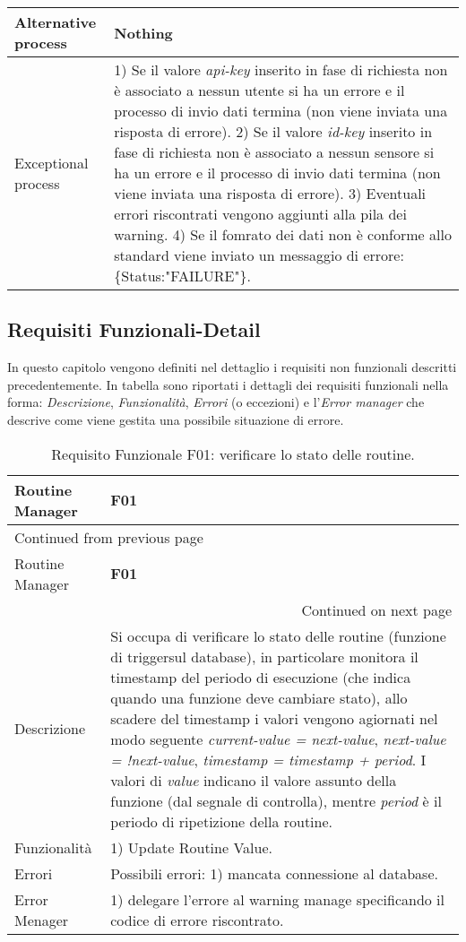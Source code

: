\documentclass[onecolumn,a4paper]{article}
\begin{document}
\begin{longtable}{|l|p{9.7cm}|}
\hline
Alternative process & Nothing\\
\hline
Exceptional process & 1) Se il valore \emph{api-key} inserito in fase di richiesta non è associato a nessun utente si ha un errore e il processo di invio dati termina (non viene inviata una risposta di errore). 2) Se il valore \emph{id-key} inserito in fase di richiesta non è associato a nessun sensore si ha un errore e il processo di invio dati termina (non viene inviata una risposta di errore). 3) Eventuali errori riscontrati vengono aggiunti alla pila dei warning. 4) Se il fomrato dei dati non è conforme allo standard viene inviato un messaggio di errore: \{Status:"FAILURE"\}.\\
\hline
\end{longtable}

\subsection{Requisiti Funzionali-Detail}
\label{sec:org0ddc4e4}
In questo capitolo vengono definiti nel dettaglio i requisiti non funzionali descritti precedentemente. In tabella sono riportati i dettagli dei requisiti funzionali nella forma: \emph{Descrizione}, \emph{Funzionalità}, \emph{Errori} (o eccezioni) e l'\emph{Error manager} che descrive come viene gestita una possibile situazione di errore. 

\begin{longtable}{|p{3cm}|p{10cm}|}
\caption{Requisito Funzionale F01: verificare lo stato delle routine.}
\\
\cellcolor{grey!15}Routine Manager & \cellcolor{grey!15} \textbf{F01}\\
\hline
\endfirsthead
\multicolumn{2}{l}{Continued from previous page} \\
\hline

\cellcolor{grey!15}Routine Manager & \cellcolor{grey!15} \textbf{F01} \\

\hline
\endhead
\hline\multicolumn{2}{r}{Continued on next page} \\
\endfoot
\endlastfoot
\hline
Descrizione & Si occupa di verificare lo stato delle routine (funzione di triggersul database), in particolare monitora il timestamp del periodo di esecuzione (che indica quando una funzione deve cambiare stato), allo scadere del timestamp i valori vengono agiornati nel modo seguente \emph{current-value = next-value}, \emph{next-value = !next-value}, \emph{timestamp = timestamp + period}. I valori di \emph{value} indicano il valore assunto della funzione (dal segnale di controlla), mentre \emph{period} è il periodo di ripetizione della routine.\\
\hline
Funzionalità & 1) Update Routine Value.\\
\hline
Errori & Possibili errori: 1) mancata connessione al database.\\
\hline
Error Menager & 1) delegare l'errore al warning manage specificando il codice di errore riscontrato.\\
\hline
\end{longtable}
\end{document}
